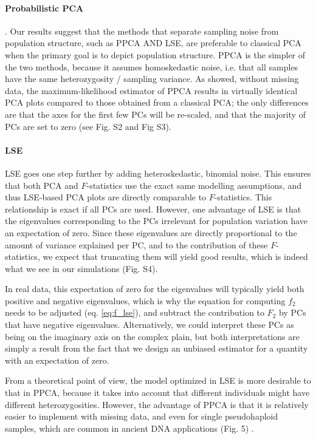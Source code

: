 \documentclass[12pt, letterpaper]{article}
\begin{document}
\paragraph{Probabilistic PCA}. Our results suggest that the methods that separate sampling noise from population structure, such as PPCA AND LSE, are preferable to classical PCA when the primary goal is to depict population structure. PPCA is the simpler of the two methods, because it assumes homoskedastic noise, i.e. that all samples have the same heterozygosity / sampling variance. As \cite{tipping_probabilistic_nodate} showed, without missing data, the maximum-likelihood estimator of PPCA results in virtually identical PCA plots compared to those obtained from a classical PCA; the only differences are that the axes for the first few PCs will be re-scaled, and that the majority of PCs are set to zero (see Fig. S2 and Fig S3).


\paragraph{LSE}
LSE goes one step further by adding heteroskedastic, binomial noise. This ensures that both PCA and $F$-statistics use the exact same modelling assumptions, and thus LSE-based PCA plots are directly comparable to $F$-statistics. This relationship is exact if all PCs are used. However, one advantage of LSE is that the eigenvalues corresponding to the PCs irrelevant for population variation have an expectation of zero. Since these eigenvalues are directly proportional to the amount of variance explained per PC, and to the contribution of these $F$-statistics, we expect that truncating them will yield good results, which is indeed what we see in our simulations (Fig. S4). 

In real data, this expectation of zero for the eigenvalues will typically yield both positive and negative eigenvalues, which is why the equation for computing $f_2$ needs to be adjusted (eq. \ref{eq:f_lse}), and subtract the contribution to $F_2$ by PCs that have negative eigenvalues. Alternatively, we could interpret these PCs as being on the imaginary axis on the complex plain, but both interpretations are simply a result from the fact that we design an unbiased estimator for a quantity with an expectation of zero. 

From a theoretical point of view, the model optimized in LSE is more desirable to that in PPCA, because it takes into account that different individuals might have different heterozygosities. However, the advantage of PPCA is that it is relatively easier to implement with missing data, and even for single pseudohaploid samples, which are common in ancient DNA applications (Fig. 5) \cite{tipping_probabilistic_nodate, orlando_ancient_2021}. 
\end{document}
